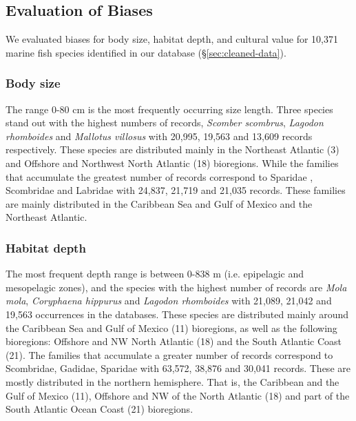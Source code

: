 \documentclass[12pt,authoryear]{elsarticle}
\begin{document}


\subsection{Evaluation of Biases}

We evaluated biases for body size, habitat depth, and cultural value for 10,371 marine fish species identified in our database (\S \ref{sec:cleaned-data}).

\subsubsection{Body size}
The range 0-80 cm is the most frequently occurring size length. Three species stand out with the highest numbers of records, \textit{Scomber scombrus}, \textit{Lagodon rhomboides} and \textit{Mallotus villosus}  with 20,995, 19,563 and 13,609 records respectively. These species are distributed mainly in the Northeast Atlantic (3) and Offshore and Northwest North Atlantic (18) bioregions. While the families that accumulate the greatest number of records correspond to Sparidae , Scombridae and Labridae with 24,837, 21,719 and 21,035 records. These families are mainly distributed in the Caribbean Sea and Gulf of Mexico and the Northeast Atlantic.  

\subsubsection{Habitat depth}
The most frequent depth range is between 0-838 m (i.e. epipelagic and mesopelagic zones), and the species with the highest number of records are \textit{Mola mola}, \textit{Coryphaena hippurus} and \textit{Lagodon rhomboides} with 21,089, 21,042 and 19,563 occurrences in the databases. These species are distributed mainly around the Caribbean Sea and Gulf of Mexico (11) bioregions, as well as the following bioregions: Offshore and NW North Atlantic (18) and the South Atlantic Coast (21). The families that accumulate a greater number of records correspond to Scombridae, Gadidae, Sparidae with 63,572, 38,876 and 30,041 records. These are mostly distributed in the northern hemisphere. That is, the Caribbean and the Gulf of Mexico (11), Offshore and NW of the North Atlantic (18) and part of the South Atlantic Ocean Coast (21) bioregions.
\end{document}
